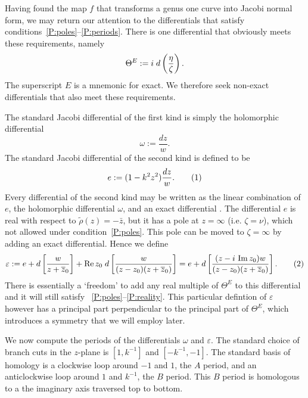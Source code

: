 \documentclass{article}
\begin{document}
Having found the map $f$ that transforms a genus one curve into Jacobi normal form, we may return our attention to the differentials that satisfy conditions~\ref{P:poles}--\ref{P:periods}.
There is one differential that obviously meets these requirements, namely
\[
\Theta^E := i\; d\left( \frac{\eta}{\zeta} \right).
\]
The superscript $E$ is a mnemonic for exact. We therefore seek non-exact differentials that also meet these requirements.

The standard Jacobi differential of the first kind is simply the holomorphic differential
\[
\omega := \frac{dz}{w}.
\]
The standard Jacobi differential of the second kind is defined to be
\[
e := (1-k^2 z^2) \frac{dz}{w}.
\labelthis{eqn:def_e}
\]
Every differential of the second kind may be written as the linear combination of $e$, the holomorphic differential $\omega$, and an exact differential \cite[Art. 167]{Hancock1910}.
The differential $e$ is real with respect to $\tilde{\rho}(z) = -\bar{z}$, but it has a pole at $z=\infty$ (i.e. $\zeta=\nu$), which not allowed under condition~\ref{P:poles}. This pole can be moved to $\zeta=\infty$ by adding an exact differential. Hence we define 
\[
\varepsilon := e + d\left[ \frac{w}{z + \bar{z}_0} \right] + \Real z_0\; d\left[ \frac{w}{(z-z_0)(z + \bar{z}_0)} \right]
= e + d\left[ \frac{(z - \iu\,\Imag z_0)w}{(z-z_0)(z + \bar{z}_0)} \right].
\labelthis{eqn:def_varepsilon}
\]
There is essentially a `freedom' to add any real multiple of $\Theta^E$ to this differential and it will still satisfy ~\ref{P:poles}--\ref{P:reality}. This particular defintion of $\varepsilon$ however has a principal part perpendicular to the principal part of $\Theta^E$, which introduces a symmetry that we will employ later.

We now compute the periods of the differentials $\omega$ and $\varepsilon$. 
The standard choice of branch cuts in the $z$-plane is $[1,k^{-1}]$ and $[-k^{-1},-1]$. The standard basis of homology is a clockwise loop around $-1$ and $1$, the $A$ period, and an anticlockwise loop around $1$ and $k^{-1}$, the $B$ period. This $B$ period is homologous to a the imaginary axis traversed top to bottom. 
\end{document}
